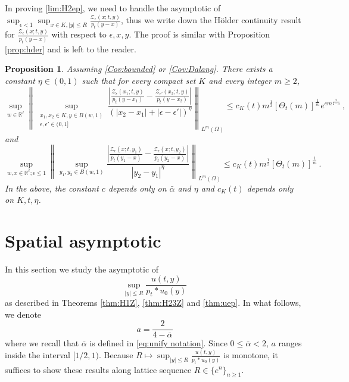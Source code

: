 \documentclass[12pt,reqno]{amsart}
\newtheorem{proposition}[theorem]{Proposition}
\theoremstyle{remark}
\let\Section=\section
\def\section{\setcounter{equation}{0}\Section}
\newcommand{\1}{\mathbf{1}}
\def\RR{\mathbb{R}}
\def\Z{\mathcal{Z}}
\def\lt{\left}
\def\rt{\right}
\def\supp{\mathrm{supp}\,}
\begin{document}
In proving \eqref{lim:H2ep}, we need to handle the asymptotic of $\sup_{\epsilon<1}\sup_ {x\in K,|y|\le R} \frac{\Z_{\epsilon}(x;t,y)}{p_t(y-x)}$, thus we write down the H\"older continuity result for $\frac{\Z_{\epsilon}(x;t,y)}{p_t(y-x)}$ with respect to $\epsilon,x,y$. The proof is similar with Proposition \ref{prop:hder} and is left to the reader. 
\begin{proposition}	
\label{prop:hlder epsilon} 
	Assuming \ref{Cov:bounded} or \ref{Cov:Dalang}. There exists a constant $\eta\in(0,1)$ such that for every compact set $K$ and every integer $m\ge2$, 
	\begin{equation}\label{eqn:hder epsilon}
		\sup_{w\in\RR^\ell} \lt\|\sup_{\substack{x_1,x_2\in K, y\in B(w,1)\\ \epsilon, \epsilon' \in (0,1]}}
		\frac{\lt|\frac{\Z_{\epsilon}(x_1;t,y)}{p_t(y-x_1)}-\frac{\Z_{\epsilon'}(x_2;t,y)}{p_t(y-x_2)}\rt|}{(|x_2-x_1|+ |\epsilon- \epsilon'|)^{\eta}} \rt\|_{L^m(\Omega)}\le c_K(t) m^{\frac12}[\Theta_t(m)]^{\frac1m}e^{cm^{\frac{2}{2-\bar{\alpha}}}}\,,
	\end{equation} 
	and
	\begin{equation}\label{eqn:hder y epsilon}
		\sup_{w, x\in\RR^\ell;\epsilon\le1} \lt\|\sup_{ y_1,y_2\in B(w,1)}
		\frac{\lt|\frac{\Z_{\epsilon}(x;t,y_1)}{p_t(y_1-x)}-\frac{\Z_{\epsilon}(x;t,y_2)}{p_t(y_2-x)}\rt|}{|y_2-y_1|^{\eta}} \rt\|_{L^m(\Omega)}\le c_K(t) m^{\frac12}[\Theta_t(m)]^{\frac1m}\,.
	\end{equation} 	
	In the above, the constant $c$ depends only on $\bar{\alpha}$ and $\eta$ and $c_K(t)$ depends only on $K,t, \eta$.
\end{proposition}
		
	
\section{Spatial asymptotic}\label{sec:upper}
In this section we study the asymptotic 
of
\begin{equation*}
 	\sup_{|y|\le R}\frac{u(t,y)}{p_t*u_0(y)}
\end{equation*}
as described in Theorems \ref{thm:H1Z}, \ref{thm:H23Z} and \ref{thm:uep}. In what follows, we denote
\begin{equation}
 	a=\frac{2}{4-\bar \alpha}
 \end{equation} 
where we recall that $\bar{\alpha}$ is defined in \eqref{eq:unify notation}. Since $0\le\bar\alpha<2$, $a$ ranges inside the interval $[1/2,1)$. Because $R\mapsto \sup_{|y|\le R}\frac{u(t,y)}{p_t*u_0(y)}$ is monotone, it suffices to show these results along lattice sequence $R\in\{e^n\}_{n\ge1}$.
\end{document}
